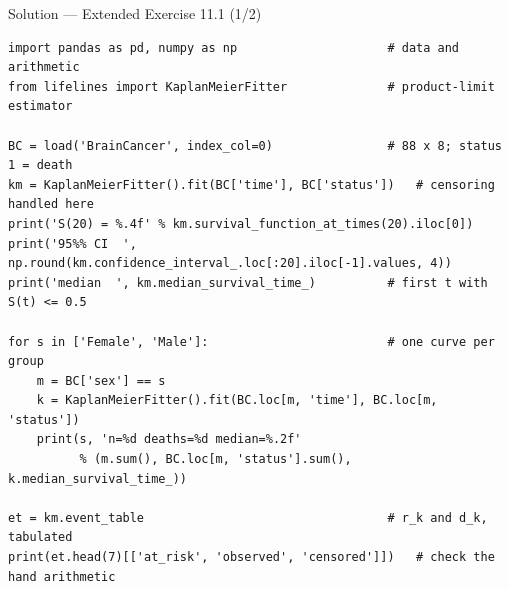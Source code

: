 \documentclass[aspectratio=169,11pt]{beamer}
\begin{document}
\begin{frame}[fragile]{Solution --- Extended Exercise 11.1 (1/2)}
\begin{solutionbox}
\begin{lstlisting}[basicstyle=\ttfamily\scriptsize]
import pandas as pd, numpy as np                     # data and arithmetic
from lifelines import KaplanMeierFitter              # product-limit estimator

BC = load('BrainCancer', index_col=0)                # 88 x 8; status 1 = death
km = KaplanMeierFitter().fit(BC['time'], BC['status'])   # censoring handled here
print('S(20) = %.4f' % km.survival_function_at_times(20).iloc[0])
print('95%% CI  ', np.round(km.confidence_interval_.loc[:20].iloc[-1].values, 4))
print('median  ', km.median_survival_time_)          # first t with S(t) <= 0.5

for s in ['Female', 'Male']:                         # one curve per group
    m = BC['sex'] == s
    k = KaplanMeierFitter().fit(BC.loc[m, 'time'], BC.loc[m, 'status'])
    print(s, 'n=%d deaths=%d median=%.2f'
          % (m.sum(), BC.loc[m, 'status'].sum(), k.median_survival_time_))

et = km.event_table                                  # r_k and d_k, tabulated
print(et.head(7)[['at_risk', 'observed', 'censored']])   # check the hand arithmetic
\end{lstlisting}
\end{solutionbox}
\end{frame}
\end{document}
